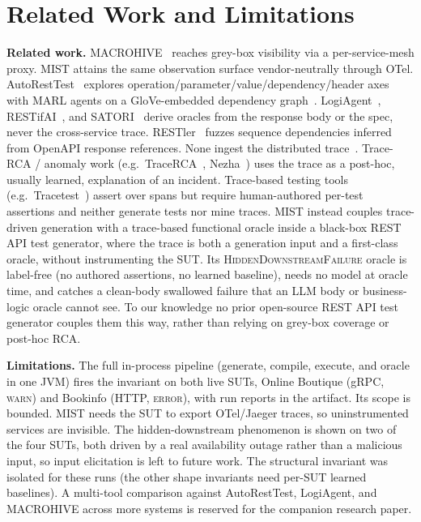 \documentclass[sigconf,screen,review]{acmart}
\begin{document}
\section{Related Work and Limitations}\label{sec:rw}

\textbf{Related work.} MACROHIVE~\cite{Giamattei2022MACROHIVE} reaches grey-box visibility via a per-service-mesh proxy. MIST attains the same observation surface vendor-neutrally through OTel. AutoRestTest~\cite{Stennett2025AutoRestTest} explores operation/parameter/value/dependency/header axes with MARL agents on a GloVe-embedded dependency graph~\cite{Kim2025AutoRestTestSPDG}. LogiAgent~\cite{Zhang2025LogiAgent}, RESTifAI~\cite{Kogler2025RESTifAI}, and SATORI~\cite{Alonso2025SATORI} derive oracles from the response body or the spec, never the cross-service trace. RESTler~\cite{Atlidakis2019RESTler} fuzzes sequence dependencies inferred from OpenAPI response references. None ingest the distributed trace~\cite{Sigelman2010Dapper,OpenTelemetry}. Trace-RCA / anomaly work (e.g.\ TraceRCA~\cite{Li2021TraceRCA}, Nezha~\cite{Yu2023Nezha}) uses the trace as a post-hoc, usually learned, explanation of an incident. Trace-based testing tools (e.g.\ Tracetest~\cite{Tracetest}) assert over spans but require human-authored per-test assertions and neither generate tests nor mine traces. MIST instead couples trace-driven generation with a trace-based functional oracle inside a black-box REST API test generator, where the trace is both a generation input and a first-class oracle, without instrumenting the SUT. Its \textsc{HiddenDownstreamFailure} oracle is label-free (no authored assertions, no learned baseline), needs no model at oracle time, and catches a clean-body swallowed failure that an LLM body or business-logic oracle cannot see. To our knowledge no prior open-source REST API test generator couples them this way, rather than relying on grey-box coverage or post-hoc RCA.

\textbf{Limitations.} The full in-process pipeline (generate, compile, execute, and oracle in one JVM) fires the invariant on both live SUTs, Online Boutique (gRPC, \textsc{warn}) and Bookinfo (HTTP, \textsc{error}), with run reports in the artifact. Its scope is bounded. MIST needs the SUT to export OTel/Jaeger traces, so uninstrumented services are invisible. The hidden-downstream phenomenon is shown on two of the four SUTs, both driven by a real availability outage rather than a malicious input, so input elicitation is left to future work. The structural invariant was isolated for these runs (the other shape invariants need per-SUT learned baselines). A multi-tool comparison against AutoRestTest, LogiAgent, and MACROHIVE across more systems is reserved for the companion research paper.
\end{document}
